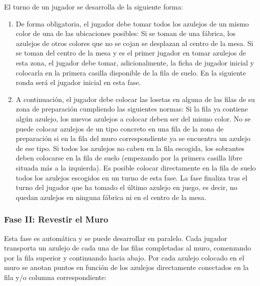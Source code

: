 \documentclass[a4paper,10pt,twocolumn]{article}
\begin{document}
	El turno de un jugador se desarrolla de la siguiente forma:
	
	\begin{enumerate}
		\item 	De forma obligatoria, el jugador debe tomar todos los azulejos de un mismo color de una de las ubicaciones posibles:
		\subitem Si se toman de una fábrica, los azulejos de otros colores que no se cojan se desplazan al centro de la mesa.
		\subitem Si se toman del centro de la mesa y es el primer jugador en tomar azulejos de esta zona, el jugador debe tomar, adicionalmente, la ficha de jugador inicial y colocarla en la primera casilla disponible de la fila de suelo. En la siguiente ronda será el jugador inicial en esta fase.
		\item A continuación, el jugador debe colocar las losetas en alguna de las filas de su zona de preparación cumpliendo las siguientes normas:
		\subitem Si la fila ya contiene algún azulejo, los nuevos azulejos a colocar deben ser del mismo color.
		\subitem No se puede colocar azulejos de un tipo concreto en una fila de la zona de preparación si en la fila del muro correspondiente ya se encuentra un azulejo de ese tipo.
		\subitem Si todos los azulejos no caben en la fila escogida, los sobrantes deben colocarse en la fila de suelo (empezando por la primera casilla libre situada más a la izquierda).
		\subitem Es posible colocar directamente en la fila de suelo todos los azulejos escogidos en un turno de esta fase.
		\subitem La fase finaliza tras el turno del jugador que ha tomado el último azulejo en juego, es decir, no quedan azulejos en ninguna fábrica ni en el centro de la mesa.
	\end{enumerate}
	
	\subsubsection{Fase II: Revestir el Muro}
	
	Esta fase es automática y se puede desarrollar en paralelo. Cada jugador transporta un azulejo de cada una de las filas completadas al muro, comenzando por la fila superior y continuando hacia abajo. Por cada azulejo colocado en el muro se anotan puntos en función de los azulejos directamente conectados en la fila y/o columna correspondiente:
	
\end{document}
